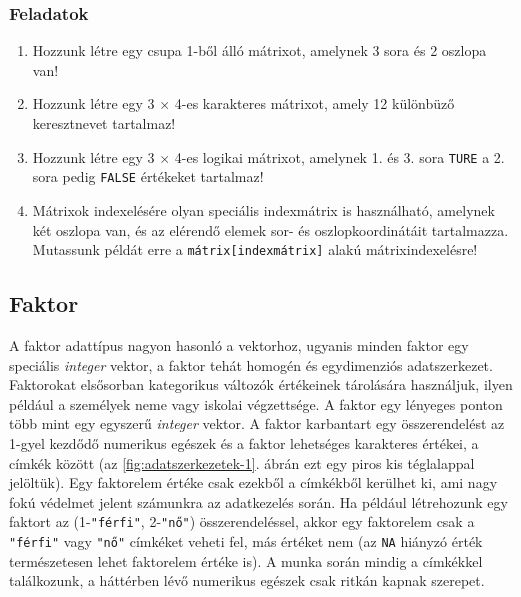 \documentclass[
]{book}
\makeatletter
\providecommand{\tightlist}{%
  \setlength{\itemsep}{0pt}\setlength{\parskip}{0pt}}
\newenvironment{kframe}{%
\medskip{}
\setlength{\fboxsep}{.8em}
 \def\at@end@of@kframe{}%
 \ifinner\ifhmode%
  \def\at@end@of@kframe{\end{minipage}}%
  \begin{minipage}{\columnwidth}%
 \fi\fi%
 \def\FrameCommand##1{\hskip\@totalleftmargin \hskip-\fboxsep
 \colorbox{shadecolor}{##1}\hskip-\fboxsep
     \hskip-\linewidth \hskip-\@totalleftmargin \hskip\columnwidth}%
 \MakeFramed {\advance\hsize-\width
   \@totalleftmargin\z@ \linewidth\hsize
   \@setminipage}}%
 {\par\unskip\endMakeFramed%
 \at@end@of@kframe}
\newenvironment{rmdblock}[1]
  {
  \begin{itemize}
  \renewcommand{\labelitemi}{
    \raisebox{-.7\height}[0pt][0pt]{
      {\setkeys{Gin}{width=3em,keepaspectratio}\texttt{[image: images/\#1]}}
    }
  }
  \setlength{\fboxsep}{1em}
  \begin{kframe}
  \item
  }
  {
  \end{kframe}
  \end{itemize}
  }
\newenvironment{rmdexercise}
  {\begin{rmdblock}{exercise}}
  {\end{rmdblock}}
\makeatother
\begin{document}
\hypertarget{az-r-nyelv-6-exercise}{%
\subsubsection{Feladatok}\label{az-r-nyelv-6-exercise}}

\begin{rmdexercise}
\begin{enumerate}
\def\labelenumi{\arabic{enumi}.}
\tightlist
\item
  Hozzunk létre egy csupa 1-ből álló mátrixot, amelynek 3 sora és 2 oszlopa van!
\item
  Hozzunk létre egy 3 \(\times\) 4-es karakteres mátrixot, amely 12 különbüző keresztnevet tartalmaz!
\item
  Hozzunk létre egy 3 \(\times\) 4-es logikai mátrixot, amelynek 1. és 3. sora \texttt{TURE} a 2. sora pedig \texttt{FALSE} értékeket tartalmaz!
\item
  Mátrixok indexelésére olyan speciális indexmátrix is használható, amelynek két oszlopa van, és az elérendő elemek sor- és oszlopkoordinátáit tartalmazza. Mutassunk példát erre a \texttt{mátrix{[}indexmátrix{]}} alakú mátrixindexelésre!
\end{enumerate}
\end{rmdexercise}

\hypertarget{faktor}{%
\subsection{Faktor}\label{faktor}}

A faktor adattípus nagyon hasonló a vektorhoz, ugyanis minden faktor egy speciális \emph{integer} vektor, a faktor tehát homogén és egydimenziós adatszerkezet. Faktorokat elsősorban kategorikus változók értékeinek tárolására használjuk, ilyen például a személyek neme vagy iskolai végzettsége. A faktor egy lényeges ponton több mint egy egyszerű \emph{integer} vektor. A faktor karbantart egy összerendelést az 1-gyel kezdődő numerikus egészek és a faktor lehetséges karakteres értékei, a címkék között (az \ref{fig:adatszerkezetek-1}. ábrán ezt egy piros kis téglalappal jelöltük). Egy faktorelem értéke csak ezekből a címkékből kerülhet ki, ami nagy fokú védelmet jelent számunkra az adatkezelés során. Ha például létrehozunk egy faktort az (1-\texttt{"férfi"}, 2-\texttt{"nő"}) összerendeléssel, akkor egy faktorelem csak a \texttt{"férfi"} vagy \texttt{"nő"} címkéket veheti fel, más értéket nem (az \texttt{NA} hiányzó érték természetesen lehet faktorelem értéke is). A munka során mindig a címkékkel találkozunk, a háttérben lévő numerikus egészek csak ritkán kapnak szerepet.
\end{document}
